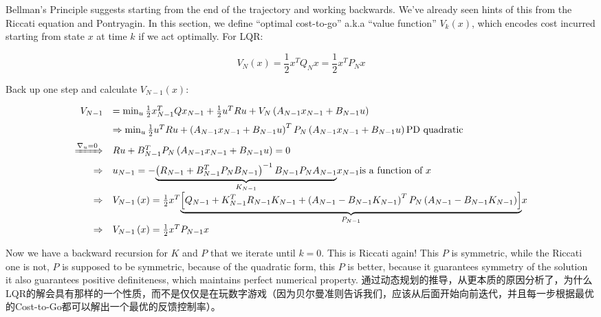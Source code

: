 Bellman's Principle suggests starting from the end of the trajectory and working backwards. We've already seen hints of this from the Riccati equation and Pontryagin. In this section, we define ``optimal cost-to-go'' a.k.a ``value function'' $V_k(x)$, which encodes cost incurred starting from state $x$ at time $k$ if we act optimally. For LQR:

\begin{equation}
    V_N(x) = \frac{1}{2}x^TQ_Nx=\frac{1}{2}x^TP_Nx
\end{equation}

Back up one step and calculate $V_{N-1}(x)$:

\begin{equation}
    \begin{array}{rl}
        V_{N-1}&		=\min_u\frac{1}{2}x_{N-1}^{T}Qx_{N-1}+\frac{1}{2}u^TRu+V_N\left( A_{N-1}x_{N-1}+B_{N-1}u \right)\\[6.18pt]
        &		\Rightarrow\min_u\frac{1}{2}u^TRu+\left( A_{N-1}x_{N-1}+B_{N-1}u \right) ^TP_N\left( A_{N-1}x_{N-1}+B_{N-1}u \right) \text{PD quadratic}\\[6.18pt]
        \xRightarrow{\nabla _u=0}&		Ru+B_{N-1}^{T}P_N\left( A_{N-1}x_{N-1}+B_{N-1}u \right) =0\\[6.18pt]
        \Rightarrow&		u_{N-1}=-\underset{K_{N-1}}{\underbrace{\left( R_{N-1}+B_{N-1}^{T}P_NB_{N-1} \right) ^{-1}B_{N-1}P_NA_{N-1}}}x_{N-1}\text{is a function of }x\\[6.18pt]
        \Rightarrow&		V_{N-1}\left( x \right) =\frac{1}{2}x^T\underset{P_{N-1}}{\underbrace{\left[ Q_{N-1}+K_{N-1}^TR_{N-1}K_{N-1}+\left( A_{N-1}-B_{N-1}K_{N-1} \right) ^TP_N\left( A_{N-1}-B_{N-1}K_{N-1} \right) \right]}} x \\[6.18pt]
        \Rightarrow&		V_{N-1}\left( x \right) =\frac{1}{2} x^T P_{N-1} x
    \end{array}
    \label{equ:lqr-dp}
\end{equation}

Now we have a backward recursion for $K$ and $P$ that we iterate until $k=0$. This is Riccati again! This $P$ is symmetric, while the Riccati one is not, $P$ is supposed to be symmetric, because of the quadratic form, this $P$ is better, because it guarantees symmetry of the solution it also guarantees positive definiteness, which maintains perfect numerical property. 通过动态规划的推导，从更本质的原因分析了，为什么LQR的解会具有那样的一个性质，而不是仅仅是在玩数字游戏（因为贝尔曼准则告诉我们，应该从后面开始向前迭代，并且每一步根据最优的Cost-to-Go都可以解出一个最优的反馈控制率）。


